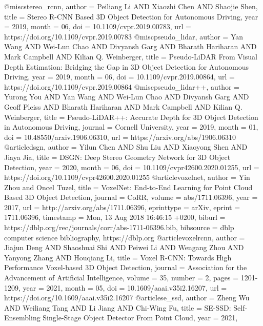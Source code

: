 \begin{bibtex-entries}

@misc{stereo_rcnn,
author = {Peiliang Li AND Xiaozhi Chen AND Shaojie Shen},
title = {Stereo R-CNN Based 3D Object Detection for Autonomous Driving},
year = {2019},
month = {06},
doi = {10.1109/cvpr.2019.00783},
url = {https://doi.org/10.1109/cvpr.2019.00783}
}
@misc{pseudo_lidar,
author = {Yan Wang AND Wei‐Lun Chao AND Divyansh Garg AND Bharath Hariharan AND Mark Campbell AND Kilian Q. Weinberger},
title = {Pseudo-LiDAR From Visual Depth Estimation: Bridging the Gap in 3D Object Detection for Autonomous Driving},
year = {2019},
month = {06},
doi = {10.1109/cvpr.2019.00864},
url = {https://doi.org/10.1109/cvpr.2019.00864}
}
@misc{pseudo_lidar++,
author = {Yurong You AND Yan Wang AND Wei‐Lun Chao AND Divyansh Garg AND Geoff Pleiss AND Bharath Hariharan AND Mark Campbell AND Kilian Q. Weinberger},
title = {Pseudo-LiDAR++: Accurate Depth for 3D Object Detection in Autonomous Driving},
journal = {Cornell University},
year = {2019},
month = {01},
doi = {10.48550/arxiv.1906.06310},
url = {https://arxiv.org/abs/1906.06310}
}
@article{dsgn,
author = {Yilun Chen AND Shu Liu AND Xiaoyong Shen AND Jiaya Jia},
title = {DSGN: Deep Stereo Geometry Network for 3D Object Detection},
year = {2020},
month = {06},
doi = {10.1109/cvpr42600.2020.01255},
url = {https://doi.org/10.1109/cvpr42600.2020.01255}
}
@article{voxelnet,
  author       = {Yin Zhou and
                  Oncel Tuzel},
  title        = {VoxelNet: End-to-End Learning for Point Cloud Based 3D Object Detection},
  journal      = {CoRR},
  volume       = {abs/1711.06396},
  year         = {2017},
  url          = {http://arxiv.org/abs/1711.06396},
  eprinttype    = {arXiv},
  eprint       = {1711.06396},
  timestamp    = {Mon, 13 Aug 2018 16:46:15 +0200},
  biburl       = {https://dblp.org/rec/journals/corr/abs-1711-06396.bib},
  bibsource    = {dblp computer science bibliography, https://dblp.org}
}
@article{voxelrcnn,
author = {Jiajun Deng AND Shaoshuai Shi AND Peiwei Li AND Wengang Zhou AND Yanyong Zhang AND Houqiang Li},
title = {Voxel R-CNN: Towards High Performance Voxel-based 3D Object Detection},
journal = {Association for the Advancement of Artificial Intelligence},
volume = {35},
number = {2},
pages = {1201-1209},
year = {2021},
month = {05},
doi = {10.1609/aaai.v35i2.16207},
url = {https://doi.org/10.1609/aaai.v35i2.16207}
}
@article{se_ssd,
author = {Zheng Wu AND Weiliang Tang AND Li Jiang AND Chi‐Wing Fu},
title = {SE-SSD: Self-Ensembling Single-Stage Object Detector From Point Cloud},
year = {2021},
}
\end{bibtex-entries}
